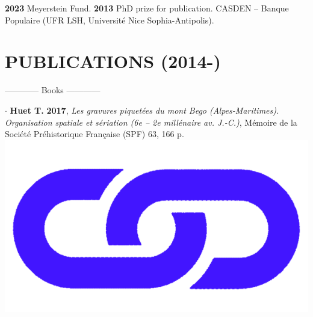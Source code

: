 \documentclass{article}
\begin{document}
\textbf{2023 }Meyerstein Fund.
\smallbreak
\textbf{2013 }PhD prize for publication. CASDEN -- Banque Populaire (UFR LSH, Universit\'{e} Nice Sophia-Antipolis).
\smallbreak

\section{PUBLICATIONS (2014-)}

\begin{center}------------ Books ------------ \end{center}
\smallbreak
$\cdot$ \textbf{Huet T.} \textbf{2017}, \textit{Les gravures piquet\'{e}es du mont Bego (Alpes-Maritimes). Organisation spatiale et s\'{e}riation (6e -- 2e mill\'{e}naire av. J.-C.)}, M\'{e}moire de la Soci\'{e}t\'{e} Pr\'{e}historique Fran\c{c}aise (SPF) 63, 166 p. \href{http://www.prehistoire.org/shop_515-40342-0-0/m63-2017-les-gravures-piquetees-du-mont-bego-alpes-maritimes-organisation-spatiale-et-seriation-vie-iie-millenaire-av.-j.-c.-t.-huet.html}{\includegraphics[scale=0.02]{link_darkblue.png}}
\end{document}
